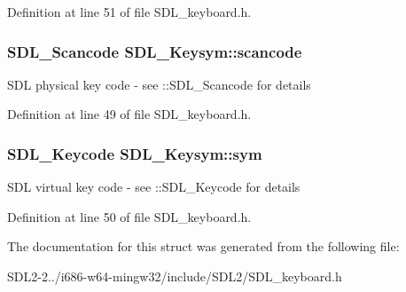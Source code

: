 Definition at line 51 of file S\+D\+L\+\_\+keyboard.\+h.

\hypertarget{structSDL__Keysym_ad47e9120a511e2efc7ec0c6d8a5ec51e}{
\subsubsection[{scancode}]{\setlength{\rightskip}{0pt plus 5cm}S\+D\+L\+\_\+\+Scancode S\+D\+L\+\_\+\+Keysym\+::scancode}}\label{structSDL__Keysym_ad47e9120a511e2efc7ec0c6d8a5ec51e}
S\+D\+L physical key code -\/ see \+::\+S\+D\+L\+\_\+\+Scancode for details 

Definition at line 49 of file S\+D\+L\+\_\+keyboard.\+h.

\hypertarget{structSDL__Keysym_a082ff1fd787b79fa6c3a445deb225f08}{
\subsubsection[{sym}]{\setlength{\rightskip}{0pt plus 5cm}S\+D\+L\+\_\+\+Keycode S\+D\+L\+\_\+\+Keysym\+::sym}}\label{structSDL__Keysym_a082ff1fd787b79fa6c3a445deb225f08}
S\+D\+L virtual key code -\/ see \+::\+S\+D\+L\+\_\+\+Keycode for details 

Definition at line 50 of file S\+D\+L\+\_\+keyboard.\+h.



The documentation for this struct was generated from the following file\+:\begin{DoxyCompactItemize}
\item 
S\+D\+L2-\/2../i686-\/w64-\/mingw32/include/\+S\+D\+L2/S\+D\+L\+\_\+keyboard.\+h\end{DoxyCompactItemize}
